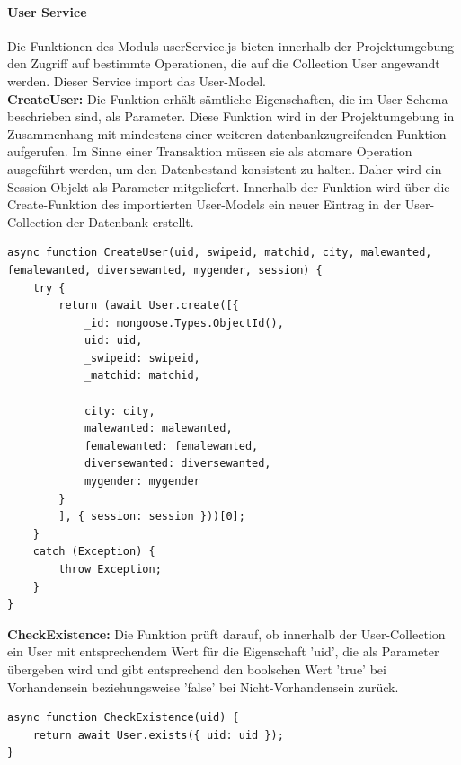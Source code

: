 %
%

\paragraph{User Service}
Die Funktionen des Moduls userService.js bieten innerhalb der Projektumgebung den Zugriff auf bestimmte Operationen, die auf die Collection User angewandt werden. Dieser Service import das User-Model.\\

\noindent
\textbf{CreateUser:}
Die Funktion erhält sämtliche Eigenschaften, die im User-Schema beschrieben sind, als Parameter. Diese Funktion wird in der Projektumgebung in Zusammenhang mit mindestens einer weiteren datenbankzugreifenden Funktion aufgerufen. Im Sinne einer Transaktion müssen sie als atomare Operation ausgeführt werden, um den Datenbestand konsistent zu halten. Daher wird ein Session-Objekt als Parameter mitgeliefert. Innerhalb der Funktion wird über die Create-Funktion des importierten User-Models ein neuer Eintrag in der User-Collection der Datenbank erstellt.

\begin{lstlisting}[caption=User Service - CreateUser, label=lst:userservicecreateuser]
async function CreateUser(uid, swipeid, matchid, city, malewanted, femalewanted, diversewanted, mygender, session) {
    try {
        return (await User.create([{
            _id: mongoose.Types.ObjectId(),
            uid: uid,
            _swipeid: swipeid,
            _matchid: matchid,

            city: city,
            malewanted: malewanted,
            femalewanted: femalewanted,
            diversewanted: diversewanted,
            mygender: mygender
        }
        ], { session: session }))[0];
    }
    catch (Exception) {
        throw Exception;
    }
}
\end{lstlisting}

\noindent
\textbf{CheckExistence:}
Die Funktion prüft darauf, ob innerhalb der User-Collection ein User mit entsprechendem Wert für die Eigenschaft 'uid', die als Parameter übergeben wird und gibt entsprechend den boolschen Wert 'true' bei Vorhandensein beziehungsweise 'false' bei Nicht-Vorhandensein zurück.\\

\begin{lstlisting}[caption=User Service - CheckExistence, label=lst:userservicecheckexistence]
async function CheckExistence(uid) {
    return await User.exists({ uid: uid });
}
\end{lstlisting}

